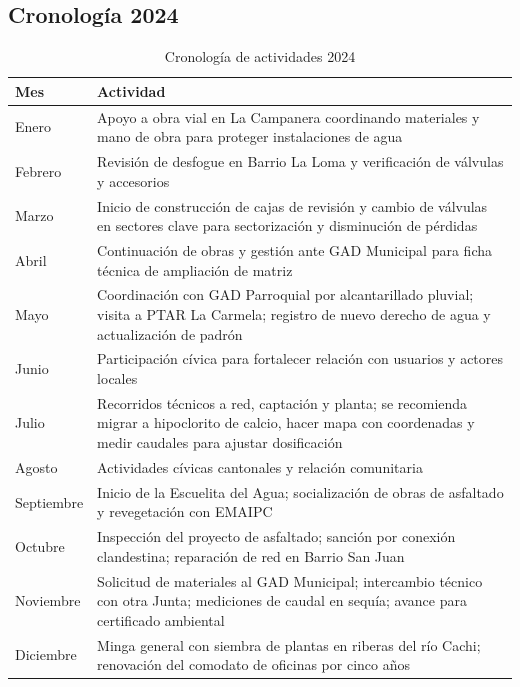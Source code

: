 \subsection*{Cronología 2024}
\begin{table}[H]
\centering
\caption{Cronología de actividades 2024}
\label{tab:cronologia_2024}
\begin{singlespace}
\begin{tabular}{p{3cm} p{11cm}}
\toprule
\textbf{Mes} & \textbf{Actividad} \\
\midrule
Enero & Apoyo a obra vial en La Campanera coordinando materiales y mano de obra para proteger instalaciones de agua \\
Febrero & Revisión de desfogue en Barrio La Loma y verificación de válvulas y accesorios \\
Marzo & Inicio de construcción de cajas de revisión y cambio de válvulas en sectores clave para sectorización y disminución de pérdidas \\
Abril & Continuación de obras y gestión ante GAD Municipal para ficha técnica de ampliación de matriz \\
Mayo & Coordinación con GAD Parroquial por alcantarillado pluvial; visita a PTAR La Carmela; registro de nuevo derecho de agua y actualización de padrón \\
Junio & Participación cívica para fortalecer relación con usuarios y actores locales \\
Julio & Recorridos técnicos a red, captación y planta; se recomienda migrar a hipoclorito de calcio, hacer mapa con coordenadas y medir caudales para ajustar dosificación \\
Agosto & Actividades cívicas cantonales y relación comunitaria \\
Septiembre & Inicio de la Escuelita del Agua; socialización de obras de asfaltado y revegetación con EMAIPC \\
Octubre & Inspección del proyecto de asfaltado; sanción por conexión clandestina; reparación de red en Barrio San Juan \\
Noviembre & Solicitud de materiales al GAD Municipal; intercambio técnico con otra Junta; mediciones de caudal en sequía; avance para certificado ambiental \\
Diciembre & Minga general con siembra de plantas en riberas del río Cachi; renovación del comodato de oficinas por cinco años \\
\bottomrule
\end{tabular}
\end{singlespace}
\end{table}

